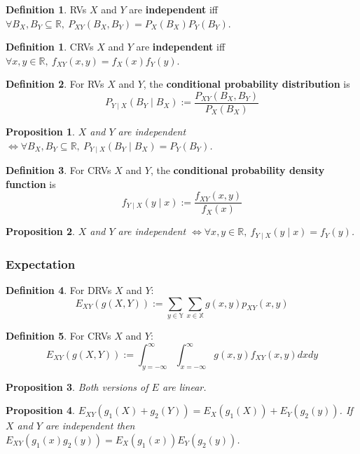 \documentclass[12pt]{article}
\newtheorem*{prop*}{Proposition}
\theoremstyle{definition}
\newtheorem{defn}{Definition}[subsection]
\newtheorem*{defn*}{Definition}
\newcommand{\R}{\mathbb{R}}
\newcommand{\X}{\mathbb{X}}
\newcommand{\Y}{\mathbb{Y}}
\begin{document}
\begin{defn*}
  RVs $X$ and $Y$ are \textbf{independent} iff $\forall B_X, B_Y \subseteq \R,\ P_{XY}(B_X, B_Y) = P_X(B_X)P_Y(B_Y)$.
\end{defn*}

\begin{defn}
  CRVs $X$ and $Y$ are \textbf{independent} iff $\forall x, y \in \R,\ f_{XY}(x, y) = f_X(x)f_Y(y)$.
\end{defn}

\begin{defn}
  For RVs $X$ and $Y$, the \textbf{conditional probability distribution} is
  $$P_{Y \mid X}(B_Y \mid B_X) := \frac{P_{XY}(B_X, B_Y)}{P_X(B_X)}$$
\end{defn}

\begin{prop*}
  $X$ and $Y$ are independent $\iff \forall B_X, B_Y \subseteq \R,\ P_{Y \mid X}(B_Y \mid B_X) = P_Y(B_Y)$.
\end{prop*}

\begin{defn}
  For CRVs $X$ and $Y$, the \textbf{conditional probability density function} is
  $$f_{Y \mid X}(y \mid x) := \frac{f_{XY}(x, y)}{f_X(x)}$$
\end{defn}

\begin{prop*}
  $X$ and $Y$ are independent $\iff \forall x, y \in \R,\ f_{Y \mid X}(y \mid x) = f_Y(y)$.
\end{prop*}

\subsubsection{Expectation}

\begin{defn}
  For DRVs $X$ and $Y$:
  $$E_{XY}(g(X, Y)) := \sum_{y \in \Y}\sum_{x \in \X}g(x, y)p_{XY}(x, y)$$
\end{defn}

\begin{defn}
  For CRVs $X$ and $Y$:
  $$E_{XY}(g(X, Y)) := \int_{y = -\infty}^{\infty}\int_{x = -\infty}^{\infty}g(x, y)f_{XY}(x, y)dxdy$$
\end{defn}

\begin{prop*}
  Both versions of $E$ are linear.
\end{prop*}

\begin{prop*}
  $E_{XY}(g_1(X) + g_2(Y)) = E_X(g_1(X)) + E_Y(g_2(y))$.
  If $X$ and $Y$ are independent then $E_{XY}(g_1(x)g_2(y)) = E_X(g_1(x))E_Y(g_2(y))$.
\end{prop*}
\end{document}
